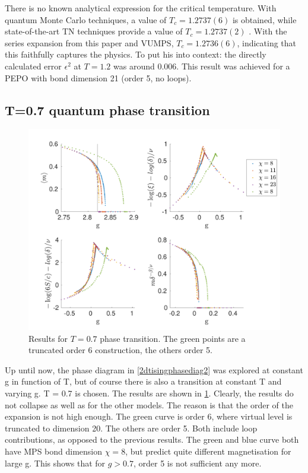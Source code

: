 There is no known analytical expression for the critical temperature. With quantum Monte Carlo techniques, a value of $T_c=1.2737(6)$ is obtained, while state-of-the-art \Gls{TN} techniques provide a value of $T_c=1.2737(2)$ \cite{Czarnik2019}. With the series expansion from this paper and \Gls{VUMPS}, $T_c=1.2736(6)$, indicating that this faithfully captures the physics. To put his into context: the directly calculated error $\epsilon^{2}$  at $T=1.2$ was around $0.006$. This result was achieved for a PEPO with bond dimension 21 (order 5, no loops).

\subsection{T=0.7 quantum phase transition}\label{tphasetranssubsec}

\begin{figure}[!htbp]
    \center
    \includegraphics[width=\textwidth]{Figuren/phasediag/t07/full.pdf}
    \caption{Results for $T=0.7$ phase transition. The green points are a truncated order 6 construction, the others order 5.  }
    \label{fig:phase:t07:full}
\end{figure}

Up until now, the phase diagram in \cref{2dtisingphasediag2} was explored at constant g in function of T, but of course there is also a transition at constant T and varying g.  T = 0.7 is chosen. The results are shown in \cref{fig:phase:t07:full}. Clearly, the results do not collapse as well as for the other models. The reason is that the order of the expansion is not high enough. The green curve is order 6, where virtual level is truncated to dimension 20. The others are order 5. Both include loop contributions, as opposed to the previous results. The green and blue curve both have \Gls{MPS} bond dimension $\chi=8$, but predict quite different magnetisation for large g. This shows that for $g>0.7$, order 5 is not sufficient any more.

